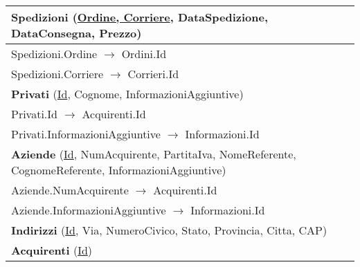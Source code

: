 \begin{center}
\begin{minipage}[t]{7.5cm}
{\begin{tabular}{P{7.5cm}}
				 \textbf{Spedizioni} (\underline{Ordine, Corriere}, DataSpedizione, DataConsegna, Prezzo)                              \\
				\midrule
				Spedizioni.Ordine $\to$ Ordini.Id                                                                                                                      \\
				\midrule
				Spedizioni.Corriere $\to$ Corrieri.Id                                                                                                                  \\                                
				\midrule

				 \textbf{Privati} (\underline{Id}, Cognome, InformazioniAggiuntive)                                                    \\
				\midrule
				Privati.Id $\to$ Acquirenti.Id                                                                                                                         \\
				\midrule
				Privati.InformazioniAggiuntive $\to$ Informazioni.Id                                                                                                   \\                                
				\midrule

				 \textbf{Aziende} (\underline{Id}, NumAcquirente, PartitaIva, NomeReferente, CognomeReferente, InformazioniAggiuntive) \\
				\midrule
				Aziende.NumAcquirente $\to$ Acquirenti.Id                                                                                                              \\
				\midrule
				Aziende.InformazioniAggiuntive $\to$ Informazioni.Id                                                                                                   \\                                
				\midrule

				 \textbf{Indirizzi} (\underline{Id}, Via, NumeroCivico, Stato, Provincia, Citta, CAP) \\
				\midrule

				 \textbf{Acquirenti} (\underline{Id})                                                 \\                                
				\midrule
			\end{tabular}
		}
	\end{minipage}
\end{center}
